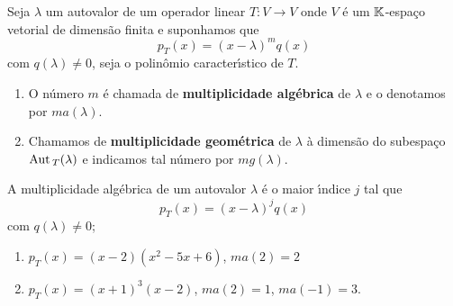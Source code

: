 \begin{definicao}
	Seja $\lambda$ um autovalor de um operador linear $T : V \to V$ onde $V$ \'e um $\mathbb{K}$-espa\c{c}o vetorial de dimens\~ao finita e suponhamos que
	\[
		p_T(x) = (x - \lambda)^mq(x)
	\]
	com $q(\lambda) \ne 0$, seja o polin\^omio caracter{\'\i}stico de $T$.
	\begin{enumerate}[label=({\roman*})]
		\item O n\'umero $m$ \'e chamada de \textbf{multiplicidade alg\'ebrica} de $\lambda$ e o denotamos por $ma(\lambda)$.
		\item Chamamos de \textbf{multiplicidade geom\'etrica} de $\lambda$ \`a dimens\~ao do subespa\c{c}o ${\rm Aut\,}_T(\lambda)$ e indicamos tal n\'umero por $mg(\lambda)$.
	\end{enumerate}
\end{definicao}

\begin{observacao}
	A multiplicidade alg\'ebrica de um autovalor $\lambda$ \'e o maior {\'\i}ndice $j$ tal que
	\[
		p_T(x) = (x - \lambda)^jq(x)
	\]
	com $q(\lambda) \ne 0$;
\end{observacao}

\begin{exemplo}
	\begin{enumerate}[label=({\roman*})]
		\item $p_T(x) = (x - 2)(x^2 - 5x + 6)$, $ma(2) = 2$
		\item $p_T(x) = (x + 1)^3(x - 2)$, $ma(2) = 1$, $ma(-1) = 3$.
	\end{enumerate}
\end{exemplo}

